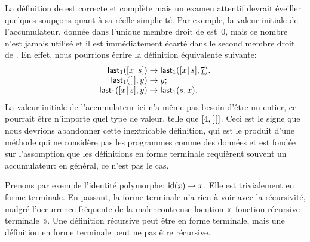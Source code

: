 La définition de  est correcte et complète mais un
examen attentif devrait éveiller quelques soupçons quant à sa réelle
simplicité. Par exemple, la valeur initiale de l'accumulateur, donnée
dans l'unique membre droit de  est~\(0\), mais ce
nombre n'est jamais utilisé et il est immédiatement écarté dans le
second membre droit de . En effet, nous pourrions
écrire la définition équivalente suivante:
\begin{equation*}
\begin{array}{r@{\;}c@{\;}l}
\fun{last}_1(\cons{x}{s}) & \rightarrow & \fun{last}_1(\cons{x}{s},\underline{7}).\\
\fun{last}_1(\el,y) & \rightarrow & y;\\
\fun{last}_1(\cons{x}{s},y) & \rightarrow & \fun{last}_1(s,x).
\end{array}
\end{equation*}
La valeur initiale de l'accumulateur ici n'a même pas besoin d'être un
entier, ce pourrait être n'importe quel type de valeur, telle que
\([4,[\,]]\). Ceci est le signe que nous devrions abandonner cette
inextricable définition, qui est le produit d'une méthode qui ne
considère pas les programmes comme des données et est fondée sur
l'assomption que les définitions en forme terminale requièrent
souvent un accumulateur: en général, ce n'est pas le cas.

Prenons par exemple l'identité polymorphe: \(\textsf{id}(x) \rightarrow
x\). Elle est trivialement en forme terminale. En passant, la forme
terminale n'a rien à voir avec la récursivité, malgré l'occurrence
fréquente de la malencontreuse locution «~fonction récursive
terminale~». Une définition récursive peut être en forme terminale,
mais une définition en forme terminale peut ne pas être récursive.
